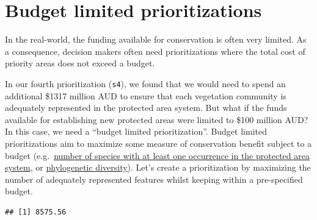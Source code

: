 \documentclass[
  12pt,
]{book}
\newenvironment{Shaded}{\begin{snugshade}}{\end{snugshade}}
\newcommand{\CommentTok}[1]{\textcolor[rgb]{0.56,0.35,0.01}{\textit{#1}}}
\newcommand{\DecValTok}[1]{\textcolor[rgb]{0.00,0.00,0.81}{#1}}
\newcommand{\FunctionTok}[1]{\textcolor[rgb]{0.00,0.00,0.00}{#1}}
\newcommand{\NormalTok}[1]{#1}
\newcommand{\OtherTok}[1]{\textcolor[rgb]{0.56,0.35,0.01}{#1}}
\newcommand{\SpecialCharTok}[1]{\textcolor[rgb]{0.00,0.00,0.00}{#1}}
\begin{document}
\hypertarget{budget-limited-prioritizations}{%
\section{Budget limited prioritizations}\label{budget-limited-prioritizations}}

In the real-world, the funding available for conservation is often very limited. As a consequence, decision makers often need prioritizations where the total cost of priority areas does not exceed a budget.

In our fourth prioritization (\texttt{s4}), we found that we would need to spend an additional \$1317 million AUD to ensure that each vegetation community is adequately represented in the protected area system. But what if the funds available for establishing new protected areas were limited to \$100 million AUD? In this case, we need a ``budget limited prioritization''. Budget limited prioritizations aim to maximize some measure of conservation benefit subject to a budget (e.g.~\href{https://prioritizr.net/reference/add_max_cover_objective.html}{number of species with at least one occurrence in the protected area system}, or \href{https://prioritizr.net/reference/add_max_phylo_div_objective.html}{phylogenetic diversity}). Let's create a prioritization by maximizing the number of adequately represented features whilst keeping within a pre-specified budget.

\begin{Shaded}
\end{Shaded}

\begin{verbatim}
## [1] 8575.56
\end{verbatim}
\end{document}
